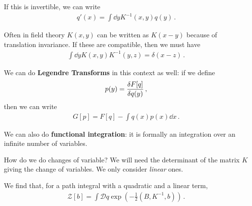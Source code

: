 \documentclass[main.tex]{subfiles}
\begin{document}
If this is invertible, we can write 
%
\begin{align}
q' (x) = \int \dd{y} K^{-1}(x, y) q(y)
\,.
\end{align}

Often in field theory \(K(x, y)\) can be written as \(K(x-y)\) because of translation invariance. If these are compatible, then we must have 
%
\begin{align}
\int \dd{y} K(x, y) K^{-1} (y, z) = \delta (x-z)
\,.
\end{align}

We can do \textbf{Legendre Transforms} in this context as well: if we define 
%
\begin{align}
p(y) = \fdv{F[q]}{q(y)}
\,,
\end{align}
%
then we can write 
%
\begin{align}
G[p] = F[q] - \int q(x) p(x) \dd{x}
\,.
\end{align}


We can also do \textbf{functional integration}: it is formally an integration over an infinite number of variables. 

How do we do changes of variable? We will need the determinant of the matrix \(K\) giving the change of variables. 
We only consider \emph{linear} ones. 

We find that, for a path integral with a quadratic and a linear term, 
%
\begin{align}
\mathscr{Z} [b] = \int \mathcal{D}q \exp(- \frac{1}{2} (B, K^{-1}, b))
\,.
\end{align}
%
\end{document}
